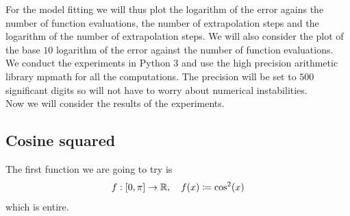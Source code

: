 For the model fitting we will thus plot the logarithm of the error agains the number of function evaluations, the number of extrapolation steps and the logarithm of the number of extrapolation steps. We will also consider the plot of the base \(10\) logarithm of the error against the number of function evaluations.\\

We conduct the experiments in Python 3 and use the high precision arithmetic library mpmath for all the computations. The precision will be set to \(500\) significant digits so will not have to worry about numerical instabilities.\\

Now we will consider the results of the experiments.

\subsection{Cosine squared}
The first function we are going to try is
\[
f: [0, \pi]\rightarrow \mathbb{R}, \quad f(x) \coloneqq \cos^2(x)
\]
which is entire.

